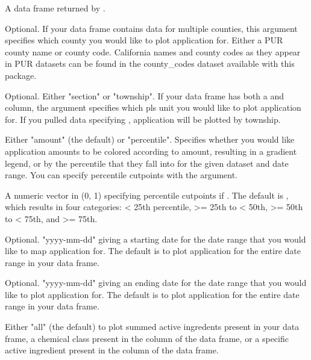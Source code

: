 \documentclass[a4paper]{book}
\begin{document}
\begin{Arguments}
\begin{ldescription}
\item[\code{clean\_pur\_df}] A data frame returned by .

\item[\code{county}] Optional. If your  data frame contains data
for multiple counties, this argument specifies which county you would like
to plot application for. Either a PUR county name or county code. California
names and county codes as they appear in PUR datasets can be found in the
county\_codes dataset available with this package.

\item[\code{pls}] Optional. Either "section" or "township". If your
 data frame has both a  and
 column, the  argument specifies which pls unit
you would like to plot application for. If you pulled data specifying
, application will be plotted by township.

\item[\code{color\_by}] Either "amount" (the default) or "percentile". Specifies
whether you would like application amounts to be colored according to
amount, resulting in a gradient legend, or by the percentile that they fall
into for the given dataset and date range. You can specify percentile
cutpoints with the  argument.

\item[\code{percentile}] A numeric vector in (0, 1) specifying percentile cutpoints
if . The default is ,
which results in four categories: < 25th percentile, >= 25th to < 50th,
>= 50th to < 75th, and >= 75th.

\item[\code{start\_date}] Optional. "yyyy-mm-dd" giving a starting date for the date
range that you would like to map application for. The default is to plot
application for the entire date range in your  data frame.

\item[\code{end\_date}] Optional. "yyyy-mm-dd" giving an ending date for the date
range that you would like to plot application for. The default is to plot
application for the entire date range in your  data frame.

\item[\code{chemicals}] Either "all" (the default) to plot summed active ingredents
present in your  data frame, a chemical class present in
the  column of the  data frame, or
a specific active ingredient present in the  column of the
 data frame.


\end{ldescription}
\end{Arguments}
\end{document}
